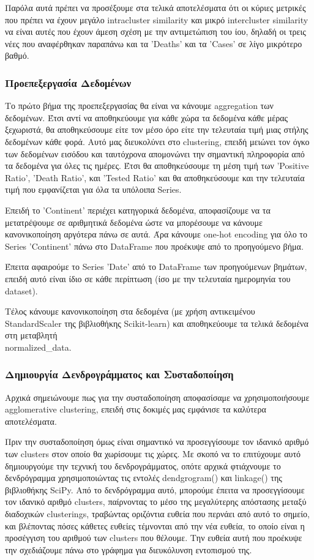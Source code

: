 \documentclass[12pt,a4paper]{article}
\begin{document}
Παρόλα αυτά πρέπει να προσέξουμε στα τελικά αποτελέσματα ότι οι κύριες μετρικές που πρέπει να έχουν μεγάλο intracluster similarity και μικρό intercluster similarity να είναι αυτές που έχουν άμεση σχέση με την αντιμετώπιση του ίου, δηλαδή οι τρεις νέες που αναφέρθηκαν παραπάνω και τα 'Deaths' και τα 'Cases' σε λίγο μικρότερο βαθμό.

\subsubsection{Προεπεξεργασία Δεδομένων}

Το πρώτο βήμα της προεπεξεργασίας θα είναι να κάνουμε aggregation των δεδομένων. Έτσι αντί να αποθηκεύουμε για κάθε χώρα τα δεδομένα κάθε μέρας ξεχωριστά, θα αποθηκεύσουμε είτε τον μέσο όρο είτε την τελευταία τιμή μιας στήλης δεδομένων κάθε φορά. Αυτό μας διευκολύνει στο clustering, επειδή μειώνει τον όγκο των δεδομένων εισόδου και ταυτόχρονα απομονώνει την σημαντική πληροφορία από τα δεδομένα για όλες τις ημέρες. Έτσι θα αποθηκεύσουμε τη μέση τιμή των 'Positive Ratio', 'Death Ratio', και 'Tested Ratio' και θα αποθηκεύσουμε και την τελευταία τιμή που εμφανίζεται για όλα τα υπόλοιπα Series.

Επειδή το 'Continent' περιέχει κατηγορικά δεδομένα, αποφασίζουμε να τα μετατρέψουμε σε αριθμητικά δεδομένα ώστε να μπορέσουμε να κάνουμε κανονικοποίηση αργότερα πάνω σε αυτά. Άρα κάνουμε one-hot encoding για όλο το Series 'Continent' πάνω στο DataFrame που προέκυψε από το προηγούμενο βήμα.

Έπειτα αφαιρούμε το Series 'Date' από το DataFrame των προηγούμενων βημάτων, επειδή αυτό είναι ίδιο σε κάθε περίπτωση (ίσο με την τελευταία ημερομηνία του dataset).

Τέλος κάνουμε κανονικοποίηση στα δεδομένα (με χρήση αντικειμένου StandardScaler της βιβλιοθήκης Scikit-learn) και αποθηκεύουμε τα τελικά δεδομένα στη μεταβλητή \\normalized\_data.

\subsubsection{Δημιουργία Δενδρογράμματος και Συσταδοποίηση}

Αρχικά σημειώνουμε πως για την συσταδοποίηση αποφασίσαμε να χρησιμοποιήσουμε agglomerative clustering, επειδή στις δοκιμές μας εμφάνισε τα καλύτερα αποτελέσματα.

Πριν την συσταδοποίηση όμως είναι σημαντικό να προσεγγίσουμε τον ιδανικό αριθμό των clusters στον οποίο θα χωρίσουμε τις χώρες. Με σκοπό να το επιτύχουμε αυτό δημιουργούμε την τεχνική του δενδρογράμματος, οπότε αρχικά φτιάχνουμε το δενδρόγραμμα χρησιμοποιώντας τις εντολές dendgrogram() και linkage() της βιβλιοθήκης SciPy. Από το δενδρόγραμμα αυτό, μπορούμε έπειτα να προσεγγίσουμε τον ιδανικό αριθμό clusters, παίρνοντας το μέσο της μεγαλύτερης απόστασης μεταξύ διαδοχικών clusterings, τραβώντας οριζόντια ευθεία που περνάει από αυτό το σημείο, και βλέποντας πόσες κάθετες ευθείες τέμνονται από την νέα ευθεία, το οποίο είναι η προσέγγιση του αριθμού των clusters που θέλουμε. Την ευθεία αυτή που προέκυψε την σχεδιάζουμε πάνω στο γράφημα για διευκόλυνση εντοπισμού της.
\end{document}

